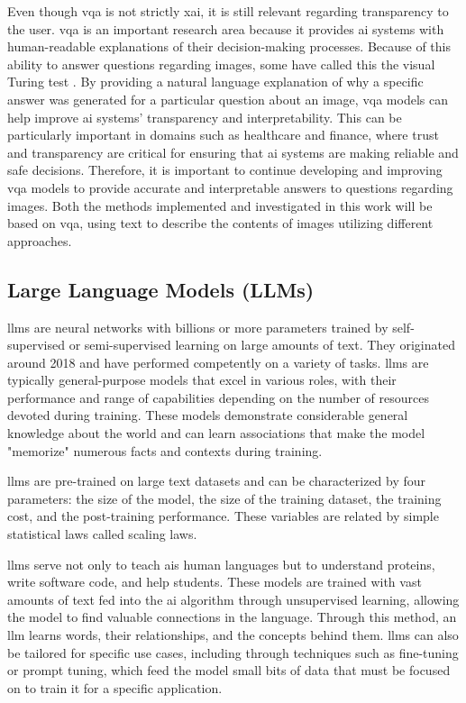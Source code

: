 Even though \gls{vqa} is not strictly \gls{xai}, it is still relevant regarding transparency to the user. \gls{vqa} is an important research area because it provides \gls{ai} systems with human-readable explanations of their decision-making processes. Because of this ability to answer questions regarding images, some have called this the visual Turing test \cite{gemanVisualTuringTest2015}.
By providing a natural language explanation of why a specific answer was generated for a particular question about an image, \gls{vqa} models can help improve \gls{ai} systems' transparency and interpretability. This can be particularly important in domains such as healthcare and finance, where trust and transparency are critical for ensuring that \gls{ai} systems are making reliable and safe decisions. Therefore, it is important to continue developing and improving \gls{vqa} models to provide accurate and interpretable answers to questions regarding images.
Both the methods implemented and investigated in this work will be based on \gls{vqa}, using text to describe the contents of images utilizing different approaches.

\subsection{Large Language Models (LLMs)}

    \glspl{llm} are neural networks with billions or more parameters trained by self-supervised or semi-supervised learning on large amounts of text. They originated around 2018 and have performed competently on a variety of tasks. \glspl{llm} are typically general-purpose models that excel in various roles, with their performance and range of capabilities depending on the number of resources devoted during training. These models demonstrate considerable general knowledge about the world and can learn associations that make the model "memorize" numerous facts and contexts during training. 

    
    
    \glspl{llm} are pre-trained on large text datasets and can be characterized by four parameters: the size of the model, the size of the training dataset, the training cost, and the post-training performance. These variables are related by simple statistical laws called scaling laws. 

    \glspl{llm} serve not only to teach \glspl{ai} human languages but to understand proteins, write software code, and help students. These models are trained with vast amounts of text fed into the \gls{ai} algorithm through unsupervised learning, allowing the model to find valuable connections in the language. Through this method, an \gls{llm} learns words, their relationships, and the concepts behind them. \glspl{llm} can also be tailored for specific use cases, including through techniques such as fine-tuning or prompt tuning, which feed the model small bits of data that must be focused on to train it for a specific application.
    
